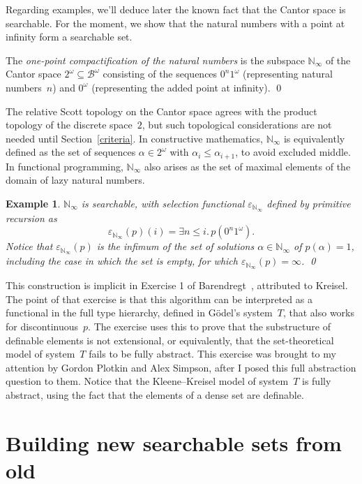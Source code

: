 \documentclass{LMCS}
\newcommand{\e}{\varepsilon}
\newtheorem{Example}[thm]{Example}
\newenvironment{example}{\begin{Example}}{\end{Example}}
\newcommand{\N}{\mathbb{N}}
\newcommand{\Bool}{2}\newcommand{\Sierp}{\mathcal{S}}
\newcommand{\pBool}{\mathcal{B}}
\newcommand{\True}{1}\newcommand{\False}{0}\newcommand{\domain}[1]{{\D_{#1}}}
\newcommand{\D}{D}
\begin{document}
Regarding examples, we'll deduce later the known fact that the
Cantor space is searchable.  For the moment, we show that the natural
numbers with a point at infinity form a searchable set.
\begin{defi}
  The \emph{one-point compactification of the natural numbers} is the
  subspace $\N_\infty$ of the Cantor space $2^\omega \subseteq
  \pBool^\omega$ consisting of the sequences $0^n 1^\omega$
  (representing natural numbers~$n$) and $0^\omega$ (representing the
  added point at infinity).  \qed
\end{defi}
The relative Scott topology on the Cantor space agrees with the
product topology of the discrete space~$\Bool$, but such topological
considerations are not needed until Section~\ref{criteria}. In
constructive mathematics, $\N_\infty$ is equivalently defined as the
set of sequences $\alpha \in 2^\omega$ with $\alpha_i \le
\alpha_{i+1}$, to avoid excluded middle. In functional programming,
$\N_{\infty}$ also arises as the set of maximal elements of the domain
of lazy natural numbers.
\begin{example}
  $\N_\infty$ is searchable, with selection functional
  $\e_{\N_\infty}$ defined by primitive recursion as
\[
\e_{\N_\infty}(p)(i) = \exists n \le i.\, p(0^n 1^\omega).
\]
Notice that
$\e_{\N_\infty}(p)$ is the infimum of the set of solutions
$\alpha \in \N_\infty$ of $p(\alpha)=\True$, including the case in
which the set is empty, for which $\e_{\N_\infty}(p)=\infty$.
\qed
\end{example}

This construction is implicit in Exercise 1 of Barendregt~\cite[Page
581]{barendregt}, attributed to Kreisel.  The point of that exercise
is that this algorithm can be interpreted as a functional in the full
type hierarchy, defined in G\"odel's system~$T$, that also works for
discontinuous~$p$. The exercise uses this to prove that the
substructure of definable elements is not extensional, or
equivalently, that the set-theoretical model of system~$T$ fails to be
fully abstract. This exercise was brought to my attention by Gordon
Plotkin and Alex Simpson, after I posed this full abstraction question
to them. Notice that the Kleene--Kreisel model of system~$T$ is fully
abstract, using the fact that the elements of a dense set are
definable.

\section{Building new searchable sets from old} \label{building}
\end{document}
